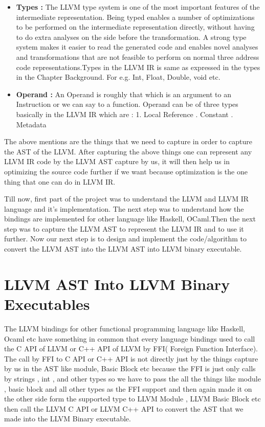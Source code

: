 \documentclass[openany]{book}
\begin{document}
\begin{itemize}
	\noindent\rule{12cm}{0.4pt} \newline
	
	\item \textbf{Types : } The LLVM type system is one of the most important features of the intermediate representation. Being typed enables a number of optimizations to be performed on the intermediate representation directly, without having to do extra analyses on the side before the transformation. A strong type system makes it easier to read the generated code and enables novel analyses and transformations that are not feasible to perform on normal three address code representations.Types in the LLVM IR is same as expressed in the types in the Chapter Background. For e.g. Int, Float, Double, void etc.
	\item \textbf{Operand : } An Operand is roughly that which is an argument to an Instruction or we can say to a function. Operand can be of three types basically in the LLVM IR which are :
	1. Local Reference . Constant . Metadata \newline
\end{itemize}
	
	
	The above mentions are the things that we need to capture in order to capture the AST of the LLVM. After capturing the above things one can represent any LLVM IR code by the LLVM AST capture by us, it will then help us in optimizing the source code further if we want because optimization is the one thing that one can do in LLVM IR.\newline
	
	Till now, first part of the project was to understand the LLVM and LLVM IR language and it's implementation. The next step was to understand how the bindings are implemented for other language like Haskell, OCaml.Then the next step was to capture the LLVM AST to represent the LLVM IR and to use it further. Now our next step is to design and implement the code/algorithm to convert the LLVM AST into the LLVM AST into LLVM binary executable.
	
\chapter{LLVM AST Into LLVM Binary Executables}
The LLVM bindings for other functional programming language like Haskell, Ocaml etc have something in common that every language bindings used to call the C API of LLVM or C++ API of LLVM by FFI( Foreign Function Interface). The call by FFI to C API or C++ API is not directly just by the things capture by us in the AST like module, Basic Block etc  because the FFI is just only calls by strings , int , and other types so we have to pass the all the things like module , basic block and all other types as the FFI support and then again made it on the other side form the supported type to LLVM Module , LLVM Basic Block etc then call the LLVM C API or LLVM C++ API to convert the AST that we made into the LLVM Binary executable.\newline \newline 
\end{document}
